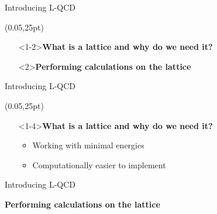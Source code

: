 
\begin{frame}[t]{Introducing L-QCD}
\begin{textblock*}{\paperwidth} (0.05\paperwidth,25pt)
\begin{itemize}
    \item[] <1-2>\textbf{What is a lattice and why do we need it?}
    \item[] <2>\textbf{Performing calculations on the lattice}
\end{itemize}
\end{textblock*}
\end{frame}

\begin{frame}[t]{Introducing L-QCD}
\begin{textblock*}{\paperwidth} (0.05\paperwidth,25pt)

\begin{itemize}
    \item[] <1-4>\textbf{What is a lattice and why do we need it?}
        \begin{itemize}
            \item <2-4> Working with minimal energies
            \item <3-4> Computationally easier to implement
        \end{itemize}
\end{itemize}

\vspace{-1.8cm}{
\hspace{8.5cm}
}
\end{textblock*}
\end{frame}

\begin{frame}{Introducing L-QCD}
    \item[] <1-4> \textbf{Performing calculations on the lattice}
\end{frame}

